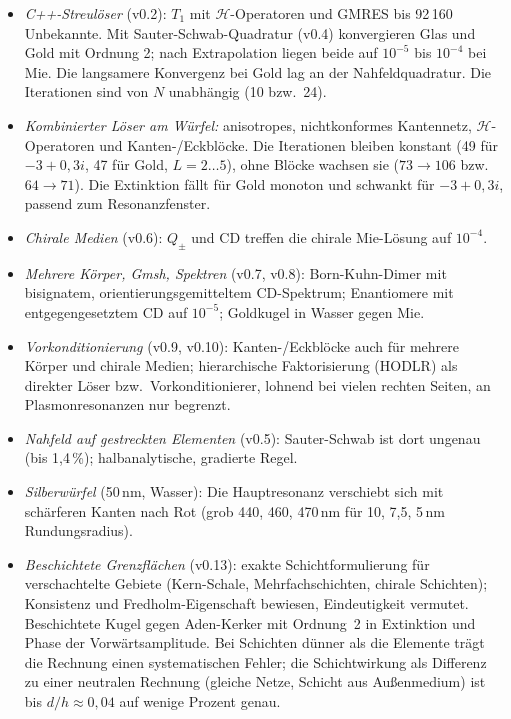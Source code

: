 \documentclass[11pt, a4paper]{article}
\begin{document}
\begin{itemize}[leftmargin=*]
  \item \emph{C++-Streulöser} (v0.2): $T_1$ mit $\mathcal{H}$-Operatoren und GMRES bis 92\,160 Unbekannte.
    Mit Sauter-Schwab-Quadratur (v0.4) konvergieren Glas und Gold mit Ordnung 2; nach Extrapolation
    liegen beide auf $10^{-5}$ bis $10^{-4}$ bei Mie. Die langsamere Konvergenz bei Gold lag an der
    Nahfeldquadratur. Die Iterationen sind von $N$ unabhängig (10 bzw.\ 24).
  \item \emph{Kombinierter Löser am Würfel:} anisotropes, nichtkonformes Kantennetz,
    $\mathcal{H}$-Operatoren und Kanten-/Eckblöcke. Die Iterationen bleiben konstant (49 für
    $-3+0{,}3i$, 47 für Gold, $L=2\dots5$), ohne Blöcke wachsen sie ($73\to106$ bzw.\ $64\to71$).
    Die Extinktion fällt für Gold monoton und schwankt für $-3+0{,}3i$, passend zum
    Resonanzfenster.
  \item \emph{Chirale Medien} (v0.6): $Q_\pm$ und CD treffen die chirale Mie-Lösung auf $10^{-4}$.
  \item \emph{Mehrere Körper, Gmsh, Spektren} (v0.7, v0.8): Born-Kuhn-Dimer mit bisignatem, orientierungsgemitteltem
    CD-Spektrum; Enantiomere mit entgegengesetztem CD auf $10^{-5}$; Goldkugel in Wasser gegen Mie.
  \item \emph{Vorkonditionierung} (v0.9, v0.10): Kanten-/Eckblöcke auch für mehrere Körper und chirale Medien;
    hierarchische Faktorisierung (HODLR) als direkter Löser bzw.\ Vorkonditionierer, lohnend bei vielen rechten
    Seiten, an Plasmonresonanzen nur begrenzt.
  \item \emph{Nahfeld auf gestreckten Elementen} (v0.5): Sauter-Schwab ist dort ungenau (bis 1,4\,\%); halbanalytische,
    gradierte Regel.
  \item \emph{Silberwürfel} (50\,nm, Wasser): Die Hauptresonanz verschiebt sich mit schärferen Kanten nach Rot
    (grob 440, 460, 470\,nm für 10, 7,5, 5\,nm Rundungsradius).
  \item \emph{Beschichtete Grenzflächen} (v0.13): exakte Schichtformulierung für verschachtelte Gebiete (Kern-Schale,
    Mehrfachschichten, chirale Schichten); Konsistenz und Fredholm-Eigenschaft bewiesen, Eindeutigkeit vermutet.
    Beschichtete Kugel gegen Aden-Kerker mit Ordnung~2 in Extinktion und Phase der Vorwärtsamplitude. Bei Schichten
    dünner als die Elemente trägt die Rechnung einen systematischen Fehler; die Schichtwirkung als Differenz zu einer
    neutralen Rechnung (gleiche Netze, Schicht aus Außenmedium) ist bis $d/h\approx0{,}04$ auf wenige Prozent genau.

\end{itemize}
\end{document}
